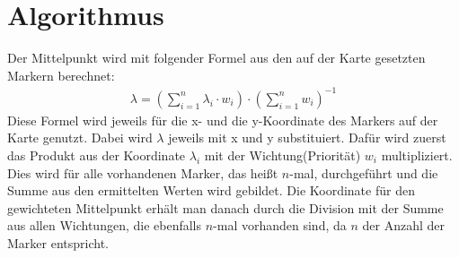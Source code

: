 \documentclass[a4paper, 12pt]{scrreprt}
\begin{document}
\chapter{Algorithmus}
Der Mittelpunkt wird mit folgender Formel aus den auf der Karte gesetzten Markern berechnet:
\begin{eqnarray}
\lambda = \left(\sum_{i=1}^{n}\lambda_i \cdot w_i \right) \cdot \left(\sum_{i=1}^{n} w_i \right)^{-1}
\end{eqnarray}
Diese Formel wird jeweils für die x- und die y-Koordinate des Markers auf der Karte genutzt.
Dabei wird $\lambda$ jeweils mit x und y substituiert.
Dafür wird zuerst das Produkt aus der Koordinate $\lambda_i$ mit der Wichtung(Priorität) $w_i$ multipliziert.
Dies wird für alle vorhandenen Marker, das heißt $n$-mal, durchgeführt und die Summe aus den ermittelten Werten wird gebildet.
Die Koordinate für den gewichteten Mittelpunkt erhält man danach durch die Division mit der Summe aus allen Wichtungen, die ebenfalls $n$-mal vorhanden sind, da $n$ der Anzahl der Marker entspricht.
\end{document}
